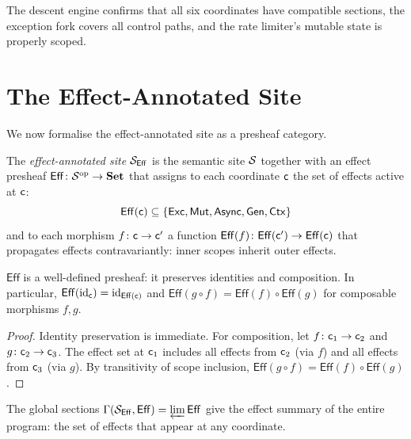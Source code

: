 \documentclass[11pt]{article}
\newcommand{\Eff}{\mathsf{Eff}}          %
\newcommand{\Exc}{\mathsf{Exc}}          %
\newcommand{\Mut}{\mathsf{Mut}}          %
\newcommand{\Async}{\mathsf{Async}}      %
\newcommand{\Gen}{\mathsf{Gen}}          %
\newcommand{\Ctx}{\mathsf{Ctx}}          %
\newcommand{\EffSite}{{\Site_{\Eff}}}      %
\begin{document}
The descent engine confirms that all six coordinates have compatible
sections, the exception fork covers all control paths, and the rate
limiter's mutable state is properly scoped.

\section{The Effect-Annotated Site}\label{sec:annotated}

We now formalise the effect-annotated site as a presheaf category.

\begin{definition}\label{def:eff-site}
The \emph{effect-annotated site} $\EffSite$ is the semantic site
$\mathcal{S}$ together with an effect presheaf
$\Eff \colon \Site^{\mathrm{op}} \to \mathbf{Set}$ that assigns to
each coordinate $\mathsf{c}$ the set of effects active at $\mathsf{c}$:
\[
  \Eff(\coord) \subseteq \{\Exc, \Mut, \Async, \Gen, \Ctx\}
\]
and to each morphism $f \colon \mathsf{c} \to \mathsf{c}'$ a function
$\Eff(f) \colon \Eff(\coord') \to \Eff(\coord)$ that propagates
effects contravariantly: inner scopes inherit outer effects.
\end{definition}

\begin{theorem}\label{thm:functoriality}
$\Eff$ is a well-defined presheaf: it preserves identities and
composition.  In particular, $\Eff(\mathrm{id}_\coord) = \mathrm{id}_{\Eff(\coord)}$
and $\Eff(g \circ f) = \Eff(f) \circ \Eff(g)$ for composable
morphisms $f, g$.
\end{theorem}

\begin{proof}
Identity preservation is immediate.  For composition, let
$f \colon \mathsf{c}_1 \to \mathsf{c}_2$ and $g \colon \mathsf{c}_2 \to \mathsf{c}_3$.
The effect set at $\mathsf{c}_1$ includes all effects from $\mathsf{c}_2$
(via $f$) and all effects from $\mathsf{c}_3$ (via $g$).  By transitivity
of scope inclusion, $\Eff(g \circ f) = \Eff(f) \circ \Eff(g)$.
\end{proof}

\begin{corollary}\label{cor:global-eff}
The global sections $\Gamma(\EffSite, \Eff) = \varprojlim \Eff$
give the effect summary of the entire program: the set of effects
that appear at any coordinate.
\end{corollary}
\end{document}
